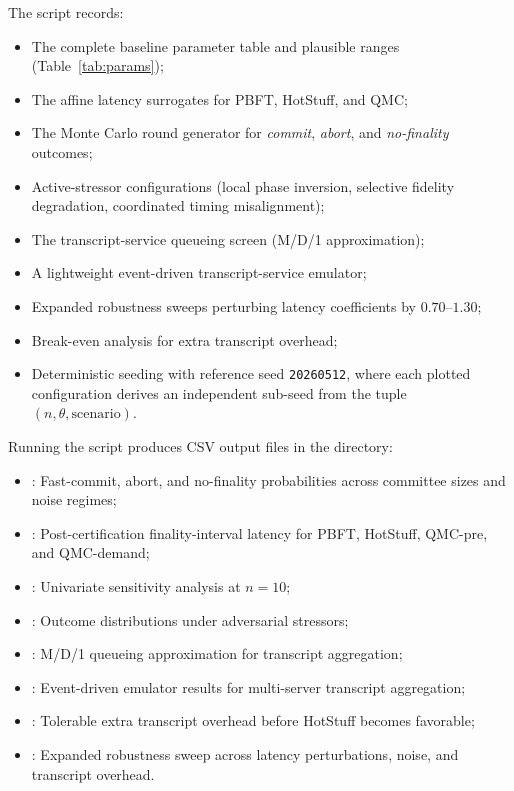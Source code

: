 \documentclass{ieeeaccess}
\begin{document}
The script records:
\begin{itemize}
    \item The complete baseline parameter table and plausible ranges (Table~\ref{tab:params});
    \item The affine latency surrogates for PBFT, HotStuff, and QMC;
    \item The Monte Carlo round generator for \textit{commit}, \textit{abort}, and \textit{no-finality} outcomes;
    \item Active-stressor configurations (local phase inversion, selective fidelity degradation, coordinated timing misalignment);
    \item The transcript-service queueing screen (M/D/1 approximation);
    \item A lightweight event-driven transcript-service emulator;
    \item Expanded robustness sweeps perturbing latency coefficients by $0.70$--$1.30$;
    \item Break-even analysis for extra transcript overhead;
    \item Deterministic seeding with reference seed \texttt{20260512}, where each plotted configuration derives an independent sub-seed from the tuple $(n,\theta,\mathrm{scenario})$.
\end{itemize}

Running the script produces CSV output files in the  directory:
\begin{itemize}
    \item {}: Fast-commit, abort, and no-finality probabilities across committee sizes and noise regimes;
    \item {}: Post-certification finality-interval latency for PBFT, HotStuff, QMC-pre, and QMC-demand;
    \item {}: Univariate sensitivity analysis at $n=10$;
    \item {}: Outcome distributions under adversarial stressors;
    \item {}: M/D/1 queueing approximation for transcript aggregation;
    \item {}: Event-driven emulator results for multi-server transcript aggregation;
    \item {}: Tolerable extra transcript overhead before HotStuff becomes favorable;
    \item {}: Expanded robustness sweep across latency perturbations, noise, and transcript overhead.
\end{itemize}
\end{document}
